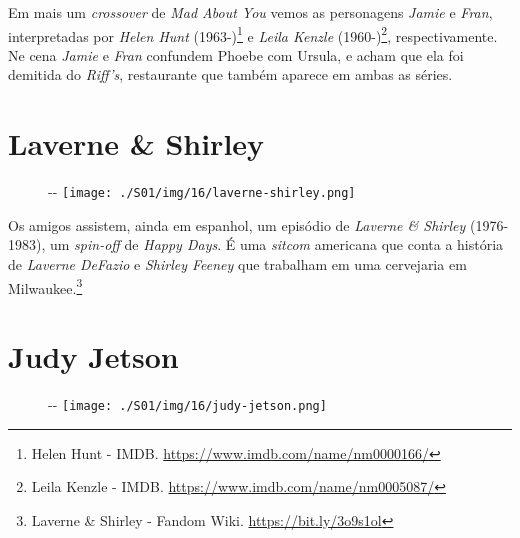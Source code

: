 Em mais um \emph{crossover} de \emph{Mad About You} vemos as personagens
\emph{Jamie} e \emph{Fran}, interpretadas por \emph{Helen Hunt}
(1963-)\footnote{\sloppy Helen Hunt - IMDB. \url{https://www.imdb.com/name/nm0000166/}}
e \emph{Leila Kenzle} (1960-)\footnote{\sloppy Leila Kenzle - IMDB. \url{https://www.imdb.com/name/nm0005087/}},
respectivamente. Ne cena \emph{Jamie} e \emph{Fran} confundem Phoebe com
Ursula, e acham que ela foi demitida do \emph{Riff's}, restaurante que
também aparece em ambas as séries.

\hypertarget{laverne-shirley}{%
\section{Laverne \& Shirley}\label{laverne-shirley}}

\begin{figure}[!ht]
  \begin{adjustwidth}{-\oddsidemargin-1in}{-\rightmargin}
    \centering
    \texttt{[image: ./S01/img/16/laverne-shirley.png]}
  \end{adjustwidth}
\end{figure}

Os amigos assistem, ainda em espanhol, um episódio de \emph{Laverne \&
Shirley} (1976-1983), um \emph{spin-off} de \emph{Happy Days}. É uma
\emph{sitcom} americana que conta a história de \emph{Laverne DeFazio} e
\emph{Shirley Feeney} que trabalham em uma cervejaria em
Milwaukee.\footnote{\sloppy Laverne \& Shirley - Fandom Wiki. \url{https://bit.ly/3o9s1ol}}

\hypertarget{judy-jetson}{%
\section{Judy Jetson}\label{judy-jetson}}

\begin{figure}[!ht]
  \begin{adjustwidth}{-\oddsidemargin-1in}{-\rightmargin}
    \centering
    \texttt{[image: ./S01/img/16/judy-jetson.png]}
  \end{adjustwidth}
\end{figure}

